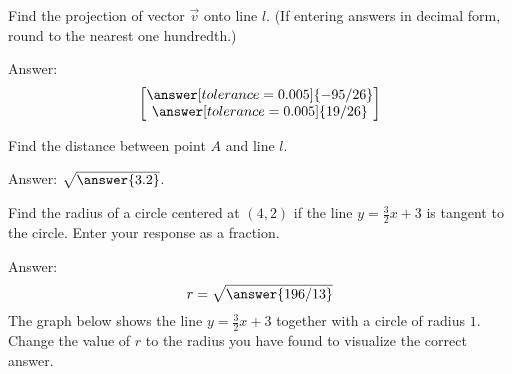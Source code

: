 \documentclass{ximera}
\begin{document}
    \begin{problem}\label{prob:proj2}
    Find the projection of vector $\vec{v}$ onto line $l$. (If entering answers in decimal form, round to the nearest one hundredth.)
     
    \begin{center}
    \end{center}
     
    Answer:
    $$\begin{bmatrix}\answer[tolerance=0.005]{-95/26}\\\answer[tolerance=0.005]{19/26}\end{bmatrix}$$
    \end{problem}
     
    \begin{problem}\label{prob:distpttoline}
    Find the distance between point $A$ and line $l$.
     
    \begin{center}
    \end{center}
     
    Answer: $\sqrt{\answer{3.2}}$.
    \end{problem}
     
    \begin{problem}\label{prob:circletangenttoline}
    Find the radius of a circle centered at $(4, 2)$ if the line $y=\frac{3}{2}x+3$ is tangent to the circle.  Enter your response as a fraction.
     
    Answer:
    $$r=\sqrt{\answer{196/13}}$$
    The graph below shows the line $y=\frac{3}{2}x+3$ together with a circle of radius $1$.  Change the value of $r$ to the radius you have found to visualize the correct answer.
     
     
    \begin{onlineOnly}
    \begin{center}
    \end{center}
    \end{onlineOnly}
     
     
     
    \end{problem}
\end{document}
